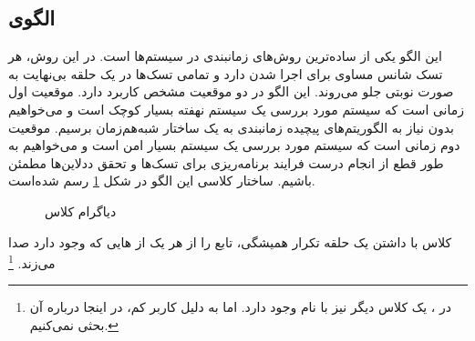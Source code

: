 \subsection{الگوی }
\label{scheduleCyclicExecSec}
\begin{RTL}
این الگو یکی از ساده‌ترین روش‌های زمانبندی در سیستم‌ها است. در این روش،
هر تسک شانس مساوی برای اجرا شدن دارد و تمامی تسک‌ها در یک حلقه
بی‌نهایت به صورت نوبتی جلو می‌روند.
این الگو در دو موقعیت مشخص کاربرد دارد. موقعیت اول زمانی است که سیستم
مورد بررسی یک سیستم نهفته بسیار کوچک است و می‌خواهیم بدون نیاز به
الگوریتم‌های پیچیده زمانبندی به یک ساختار شبه‌هم‌زمان برسیم.
موقعیت دوم زمانی است که سیستم مورد بررسی یک سیستم بسیار امن است و
می‌خواهیم به طور قطع از انجام درست فرایند برنامه‌ریزی برای تسک‌ها و تحقق
ددلاین‌ها مطمئن باشیم.
ساختار کلاسی این الگو در شکل \ref{scheduleCyclicExecSecClassDiag}
رسم شده‌است.
\end{RTL}
\begin{figure}[h!]
\centering
{}
\caption{دیاگرام کلاس }
\label{scheduleCyclicExecSecClassDiag}
\end{figure}
\begin{RTL}
کلاس  با داشتن یک حلقه تکرار
همیشگی، تابع  را از هر یک از هایی
که وجود دارد صدا می‌زند. \footnote{در \cite{ref1}، یک کلاس دیگر نیز
با نام  وجود دارد. اما به دلیل کاربر کم، در اینجا درباره
آن بحثی نمی‌کنیم.}
\end{RTL}